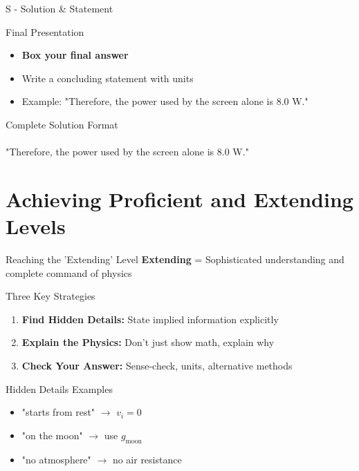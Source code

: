 \documentclass{beamer}
\begin{document}
\begin{frame}{S - Solution \& Statement}
\begin{block}{Final Presentation}
\begin{itemize}
\item \textbf{Box your final answer}
\item Write a concluding statement with units
\item Example: "Therefore, the power used by the screen alone is 8.0 W."
\end{itemize}
\end{block}

\begin{block}{Complete Solution Format}
\vspace{0.5cm}
\\
\vspace{0.5cm}
\\
"Therefore, the power used by the screen alone is 8.0 W."
\end{block}

\end{frame}

\section{Achieving Proficient and Extending Levels}

\begin{frame}{Reaching the 'Extending' Level}
\textbf{Extending} = Sophisticated understanding and complete command of physics

\begin{block}{Three Key Strategies}
\begin{enumerate}
\item \textbf{Find Hidden Details:} State implied information explicitly
\item \textbf{Explain the Physics:} Don't just show math, explain why
\item \textbf{Check Your Answer:} Sense-check, units, alternative methods
\end{enumerate}
\end{block}

\begin{block}{Hidden Details Examples}
\begin{itemize}
\item "starts from rest" $\rightarrow$ $v_i = 0$
\item "on the moon" $\rightarrow$ use $g_{\text{moon}}$
\item "no atmosphere" $\rightarrow$ no air resistance
\end{itemize}
\end{block}
\end{frame}
\end{document}
